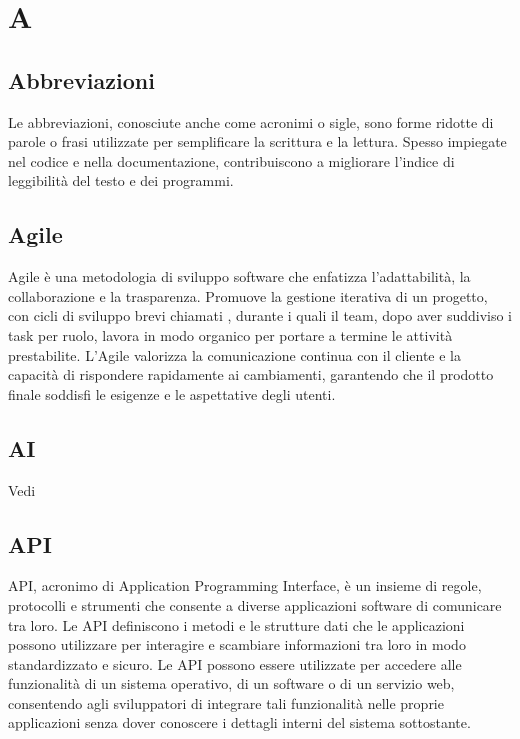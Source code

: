 \section{A}

\vspace{2em}
\subsection*{Abbreviazioni}
\par Le abbreviazioni, conosciute anche come acronimi o sigle, sono forme ridotte di parole o frasi utilizzate per semplificare la scrittura e la lettura. Spesso impiegate nel codice e nella documentazione, contribuiscono a migliorare l'indice di leggibilità del testo e dei programmi.

\vspace{2em}
\subsection*{Agile}
\par Agile è una metodologia di sviluppo software che enfatizza l'adattabilità, la collaborazione e la trasparenza. Promuove la gestione iterativa di un progetto, con cicli di sviluppo brevi chiamati , durante i quali il team, dopo aver suddiviso i task per ruolo, lavora in modo organico per portare a termine le attività prestabilite. L'Agile valorizza la comunicazione continua con il cliente e la capacità di rispondere rapidamente ai cambiamenti, garantendo che il prodotto finale soddisfi le esigenze e le aspettative degli utenti.

\vspace{2em}
\subsection*{AI}
\par Vedi 

\vspace{2em}
\subsection*{API}
\par API, acronimo di Application Programming Interface, è un insieme di regole, protocolli e strumenti che consente a diverse applicazioni software di comunicare tra loro. Le API definiscono i metodi e le strutture dati che le applicazioni possono utilizzare per interagire e scambiare informazioni tra loro in modo standardizzato e sicuro. Le API possono essere utilizzate per accedere alle funzionalità di un sistema operativo, di un software o di un servizio web, consentendo agli sviluppatori di integrare tali funzionalità nelle proprie applicazioni senza dover conoscere i dettagli interni del sistema sottostante.

